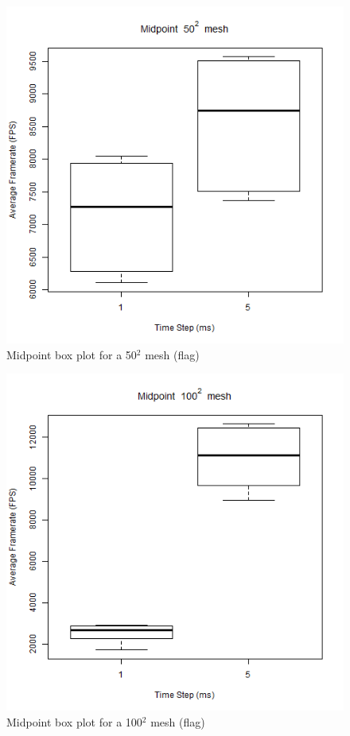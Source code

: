     \begin{figure}
    \begin{center}
      \includegraphics[scale=.9]{Figures/flag_m_50_box}
    \end{center}
    \caption{Midpoint box plot for a 50$^{2}$ mesh (flag)}
    \label{fig:m box 50 flag}
  \end{figure}
  
      \begin{figure}
    \begin{center}
      \includegraphics[scale=.9]{Figures/flag_m_100_box}
    \end{center}
    \caption{Midpoint box plot for a 100$^{2}$ mesh (flag)}
    \label{fig:m box 100 flag}
  \end{figure}
  
